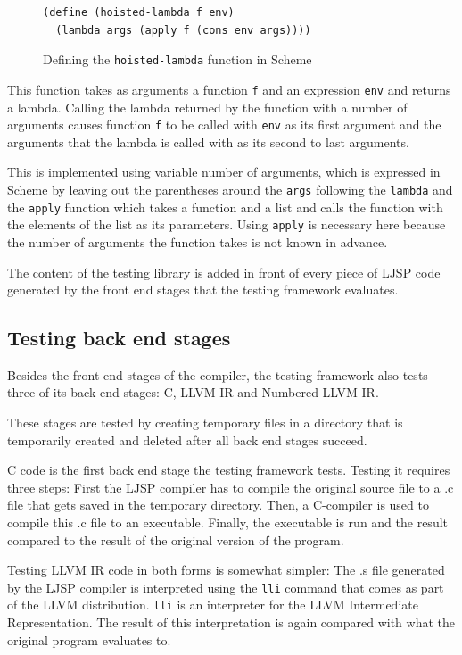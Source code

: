 \documentclass[11pt]{report}
\begin{document}
\begin{figure}[ht]
\begin{lstlisting}
(define (hoisted-lambda f env) 
  (lambda args (apply f (cons env args))))
\end{lstlisting}
\caption{Defining the \texttt{hoisted-lambda} function in Scheme}
\label{testing1}
\end{figure}

This function takes as arguments a function \texttt{f} and an expression \texttt{env} and returns a lambda. Calling the lambda returned by the function with a number of arguments causes function \texttt{f} to be called with \texttt{env} as its first argument and the arguments that the lambda is called with as its second to last arguments.

This is implemented using variable number of arguments, which is expressed in Scheme by leaving out the parentheses around the \texttt{args} following the \texttt{lambda} and the \texttt{apply} function which takes a function and a list and calls the function with the elements of the list as its parameters. Using \texttt{apply} is necessary here because the number of arguments the function takes is not known in advance.

The content of the testing library is added in front of every piece of LJSP code generated by the front end stages that the testing framework evaluates.

\subsection{Testing back end stages}

Besides the front end stages of the compiler, the testing framework also tests three of its back end stages: C, LLVM IR and Numbered LLVM IR.

These stages are tested by creating temporary files in a directory that is temporarily created and deleted after all back end stages succeed.

C code is the first back end stage the testing framework tests. Testing it requires three steps: First the LJSP compiler has to compile the original source file to a .c file that gets saved in the temporary directory. Then, a C-compiler is used to compile this .c file to an executable. Finally, the executable is run and the result compared to the result of the original version of the program.

Testing LLVM IR code in both forms is somewhat simpler: The .s file generated by the LJSP compiler is interpreted using the \texttt{lli} command that comes as part of the LLVM distribution. \texttt{lli} is an interpreter for the LLVM Intermediate Representation. The result of this interpretation is again compared with what the original program evaluates to.
\end{document}
